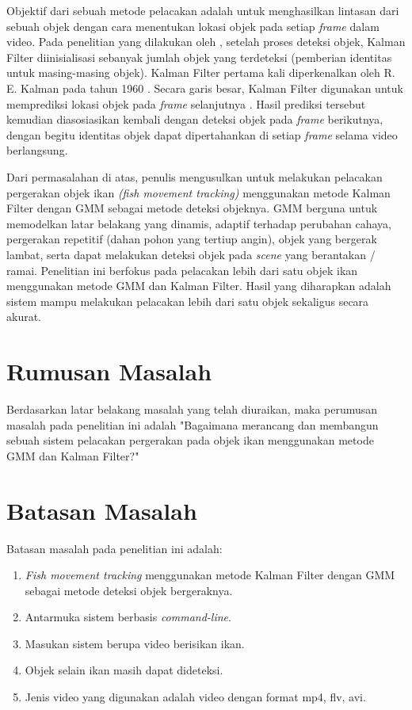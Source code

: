     Objektif dari sebuah metode pelacakan adalah untuk menghasilkan lintasan dari sebuah objek dengan cara menentukan lokasi objek pada setiap \textit{frame} dalam video. Pada penelitian yang dilakukan oleh \citep{Jeong2014}, setelah proses deteksi objek, Kalman Filter diinisialisasi sebanyak jumlah objek yang terdeteksi (pemberian identitas untuk masing-masing objek).  Kalman Filter pertama kali diperkenalkan oleh R. E. Kalman pada tahun 1960 \citep{Kalman1960}. Secara garis besar, Kalman Filter digunakan untuk memprediksi lokasi objek pada \textit{frame} selanjutnya . Hasil prediksi tersebut kemudian diasosiasikan kembali dengan deteksi objek pada \textit{frame} berikutnya, dengan begitu identitas objek dapat dipertahankan di setiap \textit{frame} selama video berlangsung.
    
    Dari permasalahan di atas, penulis mengusulkan untuk melakukan pelacakan pergerakan objek ikan \textit{(fish movement tracking)} menggunakan metode Kalman Filter dengan GMM sebagai metode deteksi objeknya. GMM berguna untuk memodelkan latar belakang yang dinamis, adaptif terhadap perubahan cahaya, pergerakan repetitif (dahan pohon yang tertiup angin), objek yang bergerak lambat, serta dapat melakukan deteksi objek pada \emph{scene} yang berantakan / ramai. Penelitian ini berfokus pada pelacakan lebih dari satu objek ikan menggunakan metode GMM dan Kalman Filter. Hasil yang diharapkan adalah sistem mampu melakukan pelacakan lebih dari satu objek sekaligus secara akurat.



\section{Rumusan Masalah}
    Berdasarkan latar belakang masalah yang telah diuraikan, maka perumusan masalah pada penelitian ini adalah "Bagaimana merancang dan membangun sebuah sistem pelacakan pergerakan pada objek ikan menggunakan metode GMM dan Kalman Filter?"


\section{Batasan Masalah}
    Batasan masalah pada penelitian ini adalah:
    \begin{enumerate}
        \item \emph{Fish movement tracking} menggunakan metode Kalman Filter dengan GMM sebagai metode deteksi objek bergeraknya.
        \item Antarmuka sistem berbasis \emph{command-line}.
        \item Masukan sistem berupa video berisikan ikan.
        \item Objek selain ikan masih dapat dideteksi.
        \item Jenis video yang digunakan adalah video dengan format mp4, flv, avi.
    \end{enumerate}


